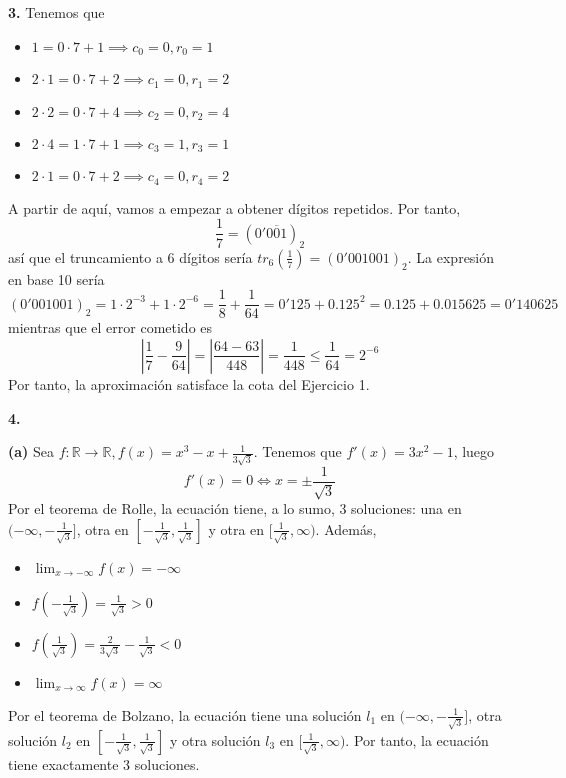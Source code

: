 \documentclass[12pt]{report}
\newcommand{\R}{\mathbb R}
\begin{document}
\vspace{2mm}
\textbf{3. } Tenemos que
\begin{itemize}
    \item $1 = 0 \cdot 7 + 1 \implies c_0 = 0, r_0 = 1$
    \item $2 \cdot 1 = 0 \cdot 7 + 2 \implies c_1 = 0, r_1 = 2$
    \item $2 \cdot 2 = 0 \cdot 7 + 4 \implies c_2 = 0, r_2 = 4$
    \item $2 \cdot 4 = 1 \cdot 7 + 1 \implies c_3 = 1, r_3 = 1$
    \item $2 \cdot 1 = 0 \cdot 7 + 2 \implies c_4 = 0, r_4 = 2$
\end{itemize}
A partir de aquí, vamos a empezar a obtener dígitos repetidos. Por tanto,
\[\frac{1}{7} = (0'\overline{001})_2\]
así que el truncamiento a 6 dígitos sería $tr_6(\frac{1}{7}) = (0'001001)_2$. La expresión en base 10 sería
\[(0'001001)_2 = 1 \cdot 2^{-3} + 1 \cdot 2^{-6} = \frac{1}{8} + \frac{1}{64} = 0'125 + 0.125^2 = 0.125 + 0.015625 = 0'140625\]
mientras que el error cometido es
\[|\frac{1}{7} - \frac{9}{64}| = |\frac{64 - 63}{448}| = \frac{1}{448} \leq \frac{1}{64} = 2^{-6}\]
Por tanto, la aproximación satisface la cota del Ejercicio 1.

\vspace{2mm}
\textbf{4. }

\vspace{2mm}
\textbf{(a)} Sea $f \colon \R \to \R, f(x) = x^3-x+\frac{1}{3\sqrt{3}}$. Tenemos que $f'(x) = 3x^2 - 1$, luego 
\[f'(x) = 0 \iff x =\pm\frac{1}{\sqrt{3}}\]
Por el teorema de Rolle, la ecuación tiene, a lo sumo, 3 soluciones: una en $(-\infty,-\frac{1}{\sqrt{3}}]$, otra en $[-\frac{1}{\sqrt{3}},\frac{1}{\sqrt{3}}]$ y otra en $[\frac{1}{\sqrt{3}},\infty)$. Además,
\begin{itemize}
    \item $\displaystyle \lim_{x \to -\infty}f(x) = - \infty$
    \item $f(-\frac{1}{\sqrt{3}}) = \frac{1}{\sqrt{3}} > 0$
    \item $f(\frac{1}{\sqrt{3}}) = \frac{2}{3\sqrt{3}} - \frac{1}{\sqrt{3}} < 0$
    \item $\displaystyle \lim_{x \to \infty}f(x) = \infty$
\end{itemize}
Por el teorema de Bolzano, la ecuación tiene una solución $l_1$ en $(-\infty,-\frac{1}{\sqrt{3}}]$, otra solución $l_2$ en $[-\frac{1}{\sqrt{3}},\frac{1}{\sqrt{3}}]$ y otra solución $l_3$ en $[\frac{1}{\sqrt{3}},\infty)$. Por tanto, la ecuación tiene exactamente 3 soluciones.
\end{document}
